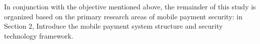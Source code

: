 \documentclass[journal]{IEEEtran}
\begin{document}
In conjunction with the objective mentioned above, the remainder of this study is organized based on the primary research areas of mobile payment security: in Section 2, Introduce the mobile payment system structure and security technology framework.
\end{document}
